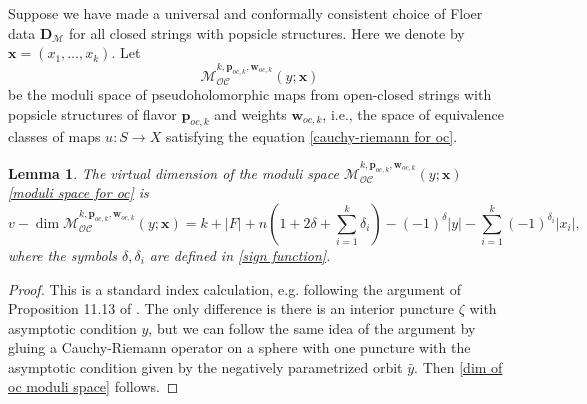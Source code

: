 \documentclass[11pt]{amsproc}
\def\oc{\mathcal{OC}}
\def\d{\delta}
\def\M{\mathcal{M}}
\newtheorem{lem}{Lemma}[section]
\theoremstyle{remark}
\numberwithin{equation}{section}
\begin{document}
Suppose we have made a universal and conformally consistent choice of Floer data $\mathbf{D}_{\M}$ for all closed strings with popsicle structures.
Here we denote by $\mathbf{x} = (x_{1}, \ldots, x_{k})$.
Let
\begin{equation}\label{moduli space for oc}
\M_{\oc}^{k, \mathbf{p}_{oc, k}, \mathbf{w}_{oc, k}}(y; \mathbf{x})
\end{equation}
be the moduli space of pseudoholomorphic maps from open-closed strings with popsicle structures of flavor $\mathbf{p}_{oc, k}$ and weights $\mathbf{w}_{oc, k}$, 
i.e., the space of equivalence classes of maps $u: S \to X$ satisfying the equation \eqref{cauchy-riemann for oc}.

\begin{lem}\label{lem: dim of oc moduli space}
The virtual dimension of the moduli space $\M_{\oc}^{k, \mathbf{p}_{oc, k}, \mathbf{w}_{oc, k}}(y; \mathbf{x})$ \eqref{moduli space for oc} is
\begin{equation}\label{dim of oc moduli space}
v-\dim \M_{\oc}^{k, \mathbf{p}_{oc, k}, \mathbf{w}_{oc, k}}(y; \mathbf{x}) = k + |F| + n(1+2\d+\sum_{i=1}^{k}\d_{i}) - (-1)^{\d}|y| - \sum_{i=1}^{k} (-1)^{\d_{i}}|x_{i}|,
\end{equation}
where the symbols $\d, \d_{i}$ are defined in \eqref{sign function}.
\end{lem}
\begin{proof}
This is a standard index calculation, e.g. following the argument of Proposition 11.13 of \cite{seidel_book}.
The only difference is there is an interior puncture $\zeta$ with asymptotic condition $y$, 
but we can follow the same idea of the argument by gluing a Cauchy-Riemann operator on a sphere with one puncture with the  asymptotic condition given by the negatively parametrized orbit $\bar{y}$.
Then \eqref{dim of oc moduli space} follows.
\end{proof}
\end{document}
